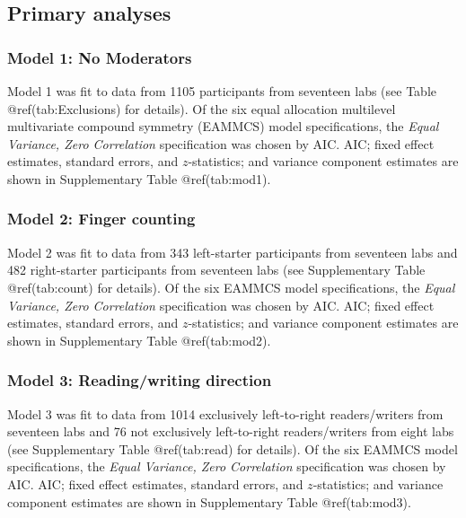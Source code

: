 \clearpage
\makeatletter
\efloat@restorefloats
\makeatother


\begin{appendix}
\section{}
\subsection{Primary analyses}\label{primary-analyses}

\subsubsection{Model 1: No Moderators}\label{model-1-no-moderators}

Model 1 was fit to data from 1105 participants from seventeen labs (see
Table @ref(tab:Exclusions) for details). Of the six equal allocation
multilevel multivariate compound symmetry (EAMMCS) model specifications,
the \emph{Equal Variance, Zero Correlation} specification was chosen by
AIC. AIC; fixed effect estimates, standard errors, and \(z\)-statistics;
and variance component estimates are shown in Supplementary Table
@ref(tab:mod1).

\subsubsection{Model 2: Finger counting}\label{model-2-finger-counting}

Model 2 was fit to data from 343 left-starter participants from
seventeen labs and 482 right-starter participants from seventeen labs
(see Supplementary Table @ref(tab:count) for details). Of the six EAMMCS
model specifications, the \emph{Equal Variance, Zero Correlation}
specification was chosen by AIC. AIC; fixed effect estimates, standard
errors, and \(z\)-statistics; and variance component estimates are shown
in Supplementary Table @ref(tab:mod2).

\subsubsection{Model 3: Reading/writing
direction}\label{model-3-readingwriting-direction}

Model 3 was fit to data from 1014 exclusively left-to-right
readers/writers from seventeen labs and 76 not exclusively left-to-right
readers/writers from eight labs (see Supplementary Table @ref(tab:read)
for details). Of the six EAMMCS model specifications, the \emph{Equal
Variance, Zero Correlation} specification was chosen by AIC. AIC; fixed
effect estimates, standard errors, and \(z\)-statistics; and variance
component estimates are shown in Supplementary Table @ref(tab:mod3).


\end{appendix}
